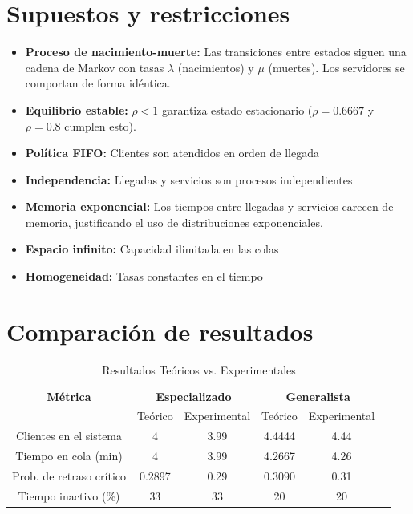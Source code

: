 \documentclass[letterpaper, 12pt]{report}
\begin{document}
\section{Supuestos y restricciones}
\begin{itemize}

    \item    \textbf{Proceso de nacimiento-muerte:} Las transiciones entre estados siguen una cadena de Markov con tasas $\lambda$ (nacimientos) y $\mu$ (muertes). Los servidores se comportan de forma id\'entica.

   \item  \textbf{Equilibrio estable:} $\rho<1$ garantiza estado estacionario ($\rho=0.6667$ y $\rho=0.8$ cumplen esto).     
    

    \item \textbf{Política FIFO:} Clientes son atendidos en orden de llegada
    

    \item \textbf{Independencia:} Llegadas y servicios son procesos independientes
   \item \textbf{Memoria exponencial:} Los tiempos entre llegadas y servicios carecen de memoria, justificando el uso de distribuciones exponenciales.   
   
    \item \textbf{Espacio infinito:} Capacidad ilimitada en las colas
    \item \textbf{Homogeneidad:} Tasas constantes en el tiempo
    
    
\end{itemize}



\newpage


\section{Comparación de resultados}
\begin{table}[h]
\centering
\caption{Resultados Teóricos vs. Experimentales}
\begin{tabular}{cccccc}
\toprule
\textbf{Métrica} & \multicolumn{2}{c}{\textbf{Especializado}} & \multicolumn{2}{c}{\textbf{Generalista}} \\
 & Teórico & Experimental & Teórico & Experimental \\
\midrule
Clientes en el sistema & 4 & 3.99 & 4.4444 & 4.44 \\
Tiempo en cola (min) & 4 & 3.99 & 4.2667 & 4.26 \\
Prob. de retraso crítico & 0.2897 & 0.29 & 0.3090 & 0.31 \\
Tiempo inactivo (\%) & 33 & 33 & 20 & 20 \\
\bottomrule
\end{tabular}
\end{table}
\end{document}
